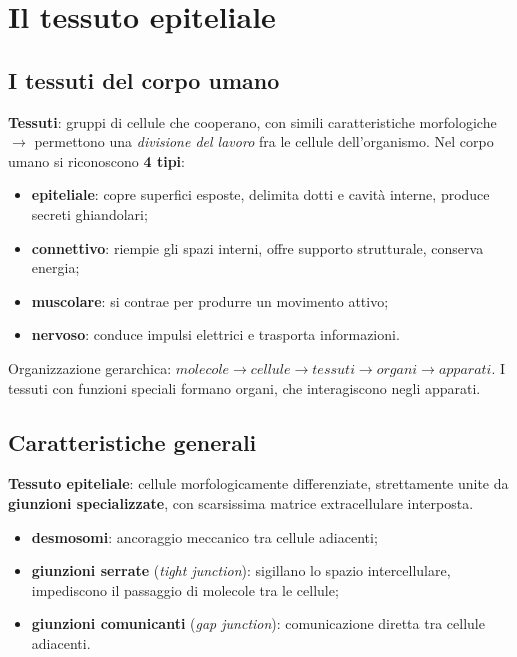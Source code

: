 \chapter{Il tessuto epiteliale}

\section{I tessuti del corpo umano}

\textbf{Tessuti}: gruppi di cellule che cooperano, con simili caratteristiche morfologiche
$\rightarrow$ permettono una \textit{divisione del lavoro} fra le cellule dell'organismo. Nel
corpo umano si riconoscono \textbf{4 tipi}:
\begin{itemize}
  \item \textbf{epiteliale}: copre superfici esposte, delimita dotti e cavità interne, produce
    secreti ghiandolari;
  \item \textbf{connettivo}: riempie gli spazi interni, offre supporto strutturale, conserva energia;
  \item \textbf{muscolare}: si contrae per produrre un movimento attivo;
  \item \textbf{nervoso}: conduce impulsi elettrici e trasporta informazioni.
\end{itemize}

Organizzazione gerarchica: $molecole \rightarrow cellule \rightarrow tessuti \rightarrow organi
\rightarrow apparati$. I tessuti con funzioni speciali formano organi, che interagiscono negli
apparati.

\section{Caratteristiche generali}

\textbf{Tessuto epiteliale}: cellule morfologicamente differenziate, strettamente unite da
\textbf{giunzioni specializzate}, con scarsissima matrice extracellulare interposta.

\begin{itemize}
  \item \textbf{desmosomi}: ancoraggio meccanico tra cellule adiacenti;
  \item \textbf{giunzioni serrate} (\textit{tight junction}): sigillano lo spazio intercellulare,
    impediscono il passaggio di molecole tra le cellule;
  \item \textbf{giunzioni comunicanti} (\textit{gap junction}): comunicazione diretta tra cellule
    adiacenti.
\end{itemize}

